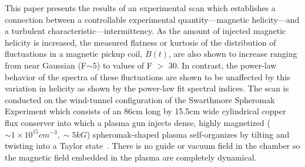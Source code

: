 \documentclass[aps,prl,amsmath,amssymb,reprint,superscriptaddress]{revtex4-1} %
\begin{document}

This paper presents the results of an experimental scan which establishes a connection between a controllable experimental quantity---magnetic helicity---and a turbulent characteristic---intermittency. As the amount of injected magnetic helicity is increased, the measured flatness or kurtosis of the distribution of fluctuations in a magnetic pickup coil, $\dot{B}(t)$, are also shown to increase ranging from near Gaussian (F$\sim 5$) to values of F $>$ 30. In contrast, the power-law behavior of the spectra of these fluctuations are shown to be unaffected by this variation in helicity as shown by the power-law fit spectral indices. The scan is conducted on the wind-tunnel configuration of the Swarthmore Spheromak Experiment which consists of an 86cm long by 15.5cm wide cylindrical copper flux conserver into which a plasma gun injects dense, highly magnetized ($\sim 1\times 10^{15} cm^{-3}, \sim 5kG$) spheromak-shaped plasma self-organizes by tilting and twisting into a Taylor state~\cite{Gray13,Matthaeus80,Taylor86}. There is no guide or vacuum field in the chamber so the magnetic field embedded in the plasma are completely dynamical. 

\end{document}
